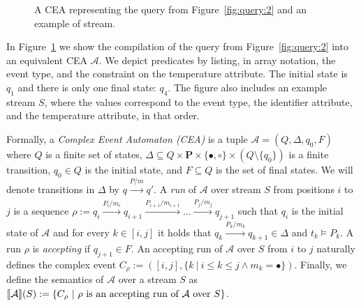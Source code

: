 \begin{figure}[h]
  \centering
  \begin{subfigure}[b]{\textwidth}
    \centering
    \vspace*{2em}
  \end{subfigure}
  \begin{subfigure}[t]{\textwidth}
    \centering
  \end{subfigure}

  \caption{A CEA representing the query from Figure~\ref{fig:query:2} and an example of stream.}
  \label{fig:cea}
\end{figure}

\begin{example}
  In Figure~\ref{fig:cea} we show the compilation of the query from Figure~\ref{fig:query:2} into an equivalent CEA $\mathcal{A}$. We depict predicates by listing, in array notation, the event type, and the constraint on the temperature attribute. The initial state is $q_{1}$ and there is only one final state: $q_{4}$. The figure also includes an example stream $S$, where the values correspond to the event type, the identifier attribute, and the temperature attribute, in that order.
\end{example}

Formally, a \emph{Complex Event Automaton (CEA)} is a tuple $\mathcal{A} = (Q, \Delta, q_{0}, F)$ where $Q$ is a finite set of states, $\Delta \subseteq Q \times \textbf{P} \times \{\bullet, \circ\} \times (Q \setminus \{ q_{0} \})$ is a finite transition, $q_{0} \in Q$ is the initial state, and $F \subseteq Q$ is the set of final states. We will denote transitions in $\Delta$ by $q \xrightarrow[]{P/m} q'$. A \emph{run} of $\mathcal{A}$ over stream $S$ from positions $i$ to $j$ is a sequence $\rho := q_{i} \xrightarrow[]{P_{i}/m_{i}} q_{i+1} \xrightarrow[]{P_{i+1}/m_{i+1}} \ldots \xrightarrow[]{P_{j}/m_{j}} q_{j+1}$ such that $q_{i}$ is the initial state of $\mathcal{A}$ and for every $k \in [i,j]$ it holds that $q_{k} \xrightarrow[]{P_{k}/m_{k}} q_{k+1} \in \Delta$ and $t_{k} \vDash P_{k}$. A run $\rho$ is \emph{accepting} if $q_{j+1} \in F$. An accepting run of $\mathcal{A}$ over $S$ from $i$ to $j$ naturally defines the complex event $C_{\rho} := ([i, j], \{ k \ | \ i \le k \le j \land m_{k} = \bullet \})$. Finally, we define the semantics of $\mathcal{A}$ over a stream $S$ as $\llbracket \mathcal{A} \rrbracket(S) := \{ C_{\rho} \ | \ \rho \text{ is an accepting run of } \mathcal{A} \text{ over } S\}$.


